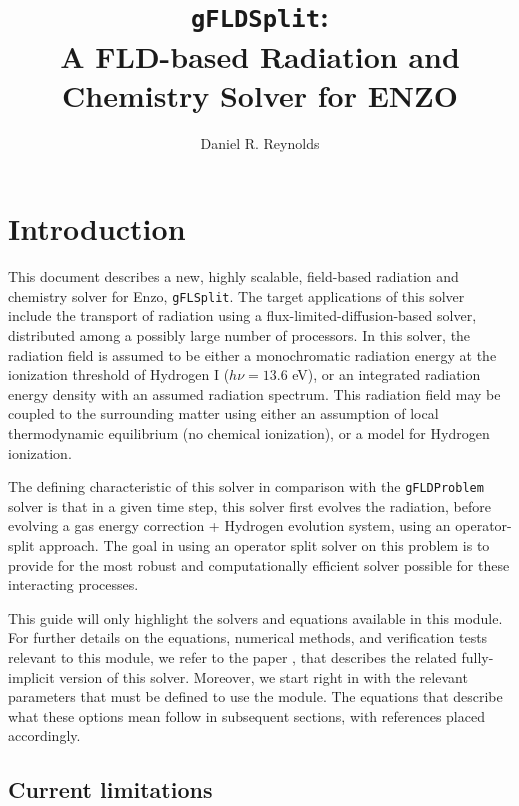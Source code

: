 \documentclass[letterpaper,10pt]{article}
\author{Daniel R. Reynolds}
\title{{\tt gFLDSplit}: \\
A FLD-based Radiation and Chemistry Solver for ENZO}
\renewcommand{\(}{\left(}
\renewcommand{\)}{\right)}
\begin{document}
\maketitle

\section{Introduction}
\label{sec:intro}

This document describes a new, highly scalable,
field-based radiation and chemistry solver for Enzo, 
{\tt gFLSplit}. The target applications of this solver include the
transport of radiation using a flux-limited-diffusion-based solver,
distributed among a possibly large number of 
processors.  In this solver, the radiation field is assumed to be
either a monochromatic radiation energy at the ionization threshold of
Hydrogen I ($h\nu = 13.6$ eV), or an integrated radiation energy
density with an assumed radiation spectrum.  This radiation field may
be coupled to the surrounding matter using either an assumption of
local thermodynamic equilibrium (no chemical ionization), or a model
for Hydrogen ionization. 

The defining characteristic of this solver in comparison
with the {\tt gFLDProblem} solver is that in a given time step, this
solver first evolves the radiation, before evolving a gas energy
correction + Hydrogen evolution system, using an operator-split
approach.  The goal in using an operator split solver on this problem
is to provide for the most robust and computationally efficient
solver possible for these interacting processes.

This guide will only highlight the solvers and equations available in
this module.  For further details on the equations, numerical methods,
and verification tests relevant to this module, we refer to the paper 
\cite{ReynoldsHayesPaschosNorman2009}, that describes the related
fully-implicit version of this solver.  Moreover, we start right in
with the relevant parameters that must be defined to use the module.
The equations that describe what these options mean follow in
subsequent sections, with references placed accordingly.


\subsection{Current limitations}
\label{sec:limitations}
\end{document}
